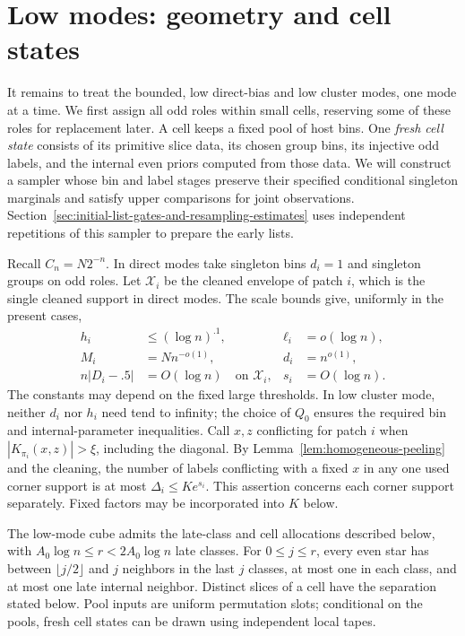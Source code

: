 \section{Low modes: geometry and cell states}
\label{sec:low-modes-geometry-and-cell-states}

It remains to treat the bounded, low direct-bias and low cluster modes,
one mode at a time. We first assign all odd roles within small cells,
reserving some of these roles for replacement later. A cell keeps a fixed
pool of host bins. One \emph{fresh cell state} consists of its primitive
slice data, its chosen group bins, its injective odd labels, and the
internal even priors computed from those data. We will construct a sampler
whose bin and label stages preserve their specified conditional singleton
marginals and satisfy upper comparisons for joint observations.
Section~\ref{sec:initial-list-gates-and-resampling-estimates}
uses independent repetitions of this sampler to prepare the early lists.

Recall \(C_n=N2^{-n}\). In direct modes take singleton bins \(d_i=1\)
and singleton groups on odd roles. Let \(\mathcal X_i\) be the cleaned
envelope of patch \(i\), which is the single cleaned support in direct
modes. The scale bounds give, uniformly in the present cases,
\[
\begin{aligned}
 h_i&\le(\log n)^{.1},& \ell_i&=o(\log n),\\
 M_i&=N n^{-o(1)},& d_i&=n^{o(1)},\\
 n|D_i-.5|&=O(\log n)\quad\text{on }\mathcal X_i,&s_i&=O(\log n).
\end{aligned}
\]
The constants may depend on the fixed large thresholds. In low cluster
mode, neither \(d_i\) nor \(h_i\) need tend to infinity; the choice of
\(Q_0\) ensures the required bin and internal-parameter inequalities.
Call \(x,z\) conflicting for patch \(i\) when
\(|K_{\pi_i}(x,z)|>\xi\), including the diagonal. By
Lemma~\ref{lem:homogeneous-peeling} and the cleaning, the number of labels
conflicting with a fixed \(x\) in any one used corner support is at most
\(\Delta_i\le K e^{s_i}\). This assertion concerns each corner support
separately. Fixed factors may be incorporated into \(K\) below.

\begin{lemma}\label{lem:late-classes-cells}
The low-mode cube admits the late-class and cell allocations described
below, with \(A_0\log n\le r<2A_0\log n\) late classes. For
\(0\le j\le r\), every even star has between
\(\lfloor j/2\rfloor\) and \(j\) neighbors in the last \(j\) classes,
at most one in each class, and at most one late internal neighbor.
Distinct slices of a cell have the separation stated below. Pool inputs
are uniform permutation slots; conditional on the pools, fresh cell states
can be drawn using independent local tapes.
\end{lemma}

